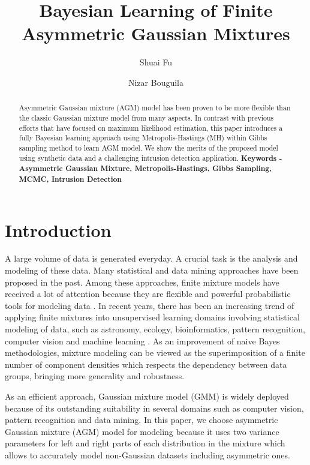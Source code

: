 \documentclass[conference]{llncs}
\begin{document}
\title{Bayesian Learning of Finite Asymmetric Gaussian Mixtures}

\author{Shuai Fu \and Nizar Bouguila}



\maketitle

\begin{abstract}
Asymmetric Gaussian mixture (AGM) model has been proven to be more flexible than the classic Gaussian mixture model from many aspects. In contrast with previous efforts that have focused on maximum likelihood estimation, this paper introduces a fully Bayesian learning approach using Metropolis-Hastings (MH) within Gibbs sampling method to learn AGM model. We show the merits of the proposed model using synthetic data and a challenging intrusion detection application.
\bigbreak
\textbf{Keywords - Asymmetric Gaussian Mixture, Metropolis-Hastings, Gibbs Sampling, MCMC, Intrusion Detection}
\end{abstract}

\section{Introduction}
A large volume of data is generated everyday. A crucial task is the analysis and modeling of these data. Many statistical and data mining approaches have been proposed in the past. Among these approaches, finite mixture models \cite{Bouguila2005,Bouguila2007,Sefidpour2012,Bouguila2009a} have received a lot of attention because they are flexible and powerful probabilistic tools for modeling data \cite{McLachlan2000}. In recent years, there has been an increasing trend of applying finite mixtures into unsupervised learning domains involving statistical modeling of data, such as astronomy, ecology, bioinformatics, pattern recognition, computer vision and machine learning \cite{Bouguila2006}. As an improvement of naive Bayes methodologies, mixture modeling can be viewed as the superimposition of a finite number of component densities which respects the dependency between data groups, bringing more generality and robustness. 

As an efficient approach, Gaussian mixture model (GMM) \cite{Elguebaly2010} is widely deployed because of its outstanding suitability in several domains such as computer vision, pattern recognition and data mining. In this paper, we choose asymmetric Gaussian mixture (AGM) model \cite{Elguebaly2014} for modeling because it uses two variance parameters for left and right parts of each distribution in the mixture which allows to accurately model non-Gaussian datasets \cite{Bouguila2012a,Boutemedjet2010} including asymmetric ones. 
\end{document}
